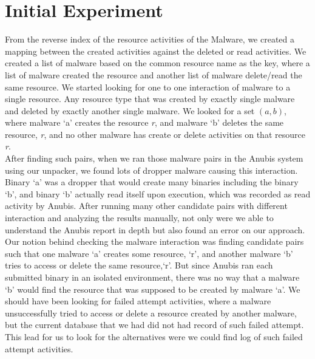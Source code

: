 \section{Initial Experiment}
\label{sec:Initial Experiment}
From the reverse index of the resource activities of the Malware, we created a mapping between the created activities against the deleted or read activities.
We created a list of malware based on the common resource name as the key, where a list of malware created the resource and another list of malware delete/read the same resource.
We started looking for one to one interaction of malware to a single resource. Any resource type that was created by exactly single malware and deleted by exactly another single malware.
We looked for a set $(a, b)$, where malware `a' creates the resource \emph{r}, and malware `b' deletes the same resource, \emph{r}, and no other malware has create or delete activities on that resource \emph{r}.\\
After finding such pairs, when we ran those malware pairs in the Anubis system using our unpacker, we found lots of dropper malware causing this interaction. Binary `a' was a dropper that would create many binaries including the binary `b', and binary `b' actually read itself upon execution, which was recorded as read activity by Anubis.
After running many other candidate pairs with different interaction and analyzing the results manually, not only were we able to understand the Anubis report in depth but also found an error on our approach.\\
Our notion behind checking the malware interaction was finding candidate pairs such that one malware `a' creates some resource, `r', and another malware `b' tries to access or delete the same resource,`r'.
But since Anubis ran each submitted binary in an isolated environment, there was no way that a malware `b' would find the resource that was supposed to be created by malware `a'.
We should have been looking for failed attempt activities, where a malware unsuccessfully tried to access or delete a resource created by another malware, but the current database that we had did not had record of such failed attempt.
This lead for us to look for the alternatives were we could find log of such failed attempt activities.\\
